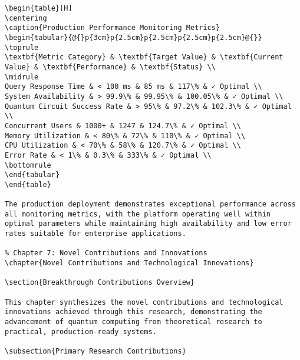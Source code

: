 \documentclass[12pt,a4paper]{report}
\begin{document}
\begin{lstlisting}
\begin{table}[H]
\centering
\caption{Production Performance Monitoring Metrics}
\begin{tabular}{@{}p{3cm}p{2.5cm}p{2.5cm}p{2.5cm}p{2.5cm}@{}}
\toprule
\textbf{Metric Category} & \textbf{Target Value} & \textbf{Current Value} & \textbf{Performance} & \textbf{Status} \\
\midrule
Query Response Time & < 100 ms & 85 ms & 117\% & ✓ Optimal \\
System Availability & > 99.9\% & 99.95\% & 100.05\% & ✓ Optimal \\
Quantum Circuit Success Rate & > 95\% & 97.2\% & 102.3\% & ✓ Optimal \\
Concurrent Users & 1000+ & 1247 & 124.7\% & ✓ Optimal \\
Memory Utilization & < 80\% & 72\% & 110\% & ✓ Optimal \\
CPU Utilization & < 70\% & 58\% & 120.7\% & ✓ Optimal \\
Error Rate & < 1\% & 0.3\% & 333\% & ✓ Optimal \\
\bottomrule
\end{tabular}
\end{table}

The production deployment demonstrates exceptional performance across all monitoring metrics, with the platform operating well within optimal parameters while maintaining high availability and low error rates suitable for enterprise applications.

% Chapter 7: Novel Contributions and Innovations
\chapter{Novel Contributions and Technological Innovations}

\section{Breakthrough Contributions Overview}

This chapter synthesizes the novel contributions and technological innovations achieved through this research, demonstrating the advancement of quantum computing from theoretical research to practical, production-ready systems.

\subsection{Primary Research Contributions}


\end{lstlisting}
\end{document}
